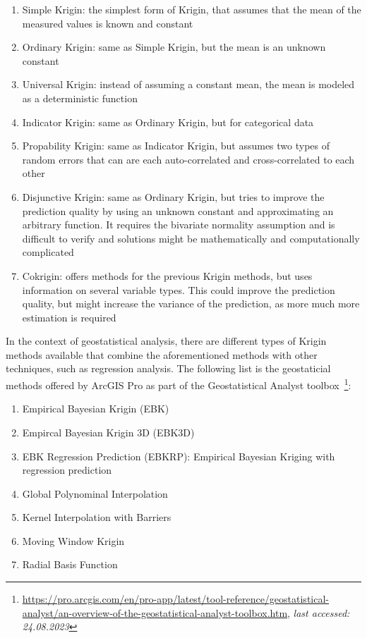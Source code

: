 \begin{enumerate}
    \item Simple Krigin: the simplest form of Krigin, that assumes that the mean of the measured values is known and constant
    \item Ordinary Krigin: same as Simple Krigin, but the mean is an unknown constant
    \item Universal Krigin: instead of assuming a constant mean, the mean is modeled as a deterministic function
    \item Indicator Krigin: same as Ordinary Krigin, but for categorical data
    \item Propability Krigin: same as Indicator Krigin, but assumes two types of random errors that can are each auto-correlated and cross-correlated to each other
    \item Disjunctive Krigin: same as Ordinary Krigin, but tries to improve the prediction quality by using an unknown constant and approximating an arbitrary function. It requires the bivariate normality assumption and is difficult to verify and solutions might be mathematically and computationally complicated
    \item Cokrigin: offers methods for the previous Krigin methods, but uses information on several variable types. This could improve the prediction quality, but might increase the variance of the prediction, as more much more estimation is required
\end{enumerate}

In the context of geostatistical analysis, there are different types of Krigin methods available that combine the aforementioned methods with other techniques, such as regression analysis. The following list is the geostaticial methods offered by ArcGIS Pro as part of the Geostatistical Analyst toolbox~\footnote{\url{https://pro.arcgis.com/en/pro-app/latest/tool-reference/geostatistical-analyst/an-overview-of-the-geostatistical-analyst-toolbox.htm}, \textit{last accessed: 24.08.2023}}:

\begin{enumerate}
    \item Empirical Bayesian Krigin (EBK)
    \item Empircal Bayesian Krigin 3D (EBK3D)
    \item EBK Regression Prediction (EBKRP): Empirical Bayesian Kriging with regression prediction
    \item Global Polynominal Interpolation
    \item Kernel Interpolation with Barriers
    \item Moving Window Krigin
    \item Radial Basis Function
\end{enumerate}

